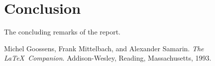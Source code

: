 \documentclass[11pt,a4paper]{report}
\begin{document}
\chapter{Conclusion}
\label{chap:conclusion}
The concluding remarks of the report.

\begin{thebibliography}{9}
Michel Goossens, Frank Mittelbach, and Alexander Samarin. 
\textit{The \LaTeX\ Companion}. 
Addison-Wesley, Reading, Massachusetts, 1993.
\end{thebibliography}
\end{document}
